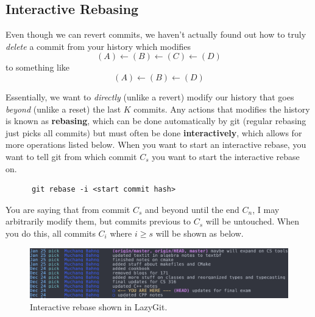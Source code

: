 \subsection{Interactive Rebasing} 

  Even though we can revert commits, we haven't actually found out how to truly \textit{delete} a commit from your history which modifies 
  \begin{equation}
    (A) \leftarrow (B) \leftarrow (C) \leftarrow (D)
  \end{equation} 
  to something like 
  \begin{equation}
    (A) \leftarrow (B) \leftarrow (D)
  \end{equation} 

  \begin{definition}[Rebasing]
    Essentially, we want to \textit{directly} (unlike a revert) modify our history that goes \textit{beyond} (unlike a reset) the last $K$ commits. Any actions that modifies the history is known as \textbf{rebasing}, which can be done automatically by git (regular rebasing just picks all commits) but must often be done \textbf{interactively}, which allows for more operations listed below. When you want to start an interactive rebase, you want to tell git from which commit $C_s$ you want to start the interactive rebase on. 
    \begin{lstlisting}
      git rebase -i <start commit hash>
    \end{lstlisting}
    You are saying that from commit $C_s$ and beyond until the end $C_n$, I may arbitrarily modify them, but commits previous to $C_s$ will be untouched. When you do this, all commits $C_i$ where $i \geq s$ will be shown as below. 

    \begin{figure}[H]
      \centering 
      \includegraphics[scale=0.3]{img/rebase.png}
      \caption{Interactive rebase shown in LazyGit.} 
      \label{fig:rebase}
    \end{figure}


\end{definition}
